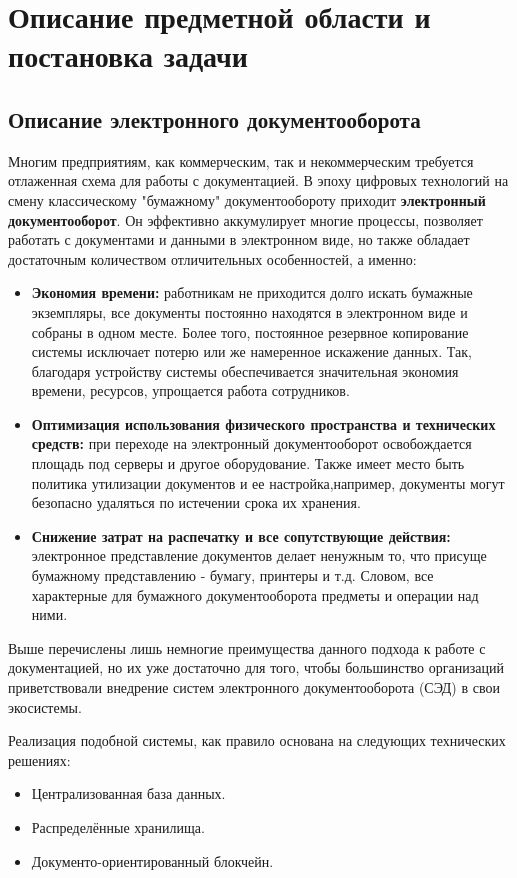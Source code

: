\chapter{Описание предметной области и постановка задачи} \label{ch:ch1}

\section{Описание электронного документооборота} \label{sec:ch1/sec1}
Многим предприятиям, как коммерческим, так и некоммерческим требуется отлаженная схема для работы с документацией.
В эпоху цифровых технологий на смену классическому "бумажному" документообороту приходит \textbf{электронный документооборот}.
Он эффективно аккумулирует многие процессы, позволяет работать с документами и данными в электронном виде, но также обладает достаточным количеством отличительных особенностей, а именно:
 \begin{itemize}
 	\item \textbf{Экономия времени:} работникам не приходится долго искать бумажные экземпляры, все документы постоянно находятся в электронном виде и собраны в одном месте. Более того, постоянное резервное копирование системы исключает потерю или же намеренное искажение данных. Так, благодаря устройству системы обеспечивается значительная экономия времени, ресурсов, упрощается работа сотрудников.
 	\item \textbf{Оптимизация использования физического пространства и технических средств:} при переходе на электронный документооборот освобождается площадь под серверы и другое оборудование. Также имеет место быть политика утилизации документов и ее настройка,например, документы могут безопасно удаляться по истечении срока их хранения.
 	\item \textbf{Снижение затрат на распечатку и все сопутствующие действия:} электронное представление документов делает ненужным то, что присуще бумажному представлению - бумагу, принтеры и т.д. Словом, все характерные для бумажного документооборота предметы и операции над ними.
 \end{itemize}

Выше перечислены лишь немногие преимущества данного подхода к работе с документацией, но их уже достаточно для того, чтобы большинство организаций приветствовали внедрение 	систем электронного документооборота (СЭД) в свои экосистемы.

Реализация подобной системы, как правило основана на следующих технических решениях:
\begin{itemize}
	\item Централизованная база данных.
	\item Распределённые хранилища.
	\item Документо-ориентированный блокчейн.
\end{itemize}
